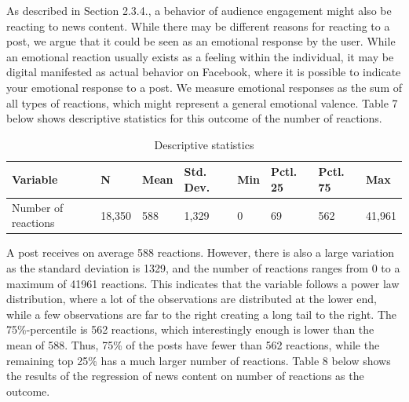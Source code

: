 \documentclass[
]{article}
\begin{document}
As described in Section 2.3.4., a behavior of audience engagement might
also be reacting to news content. While there may be different reasons
for reacting to a post, we argue that it could be seen as an emotional
response by the user. While an emotional reaction usually exists as a
feeling within the individual, it may be digital manifested as actual
behavior on Facebook, where it is possible to indicate your emotional
response to a post. We measure emotional responses as the sum of all
types of reactions, which might represent a general emotional valence.
Table 7 below shows descriptive statistics for this outcome of the
number of reactions.

\begin{table}[H]

\caption{\label{tab:react_describe}Descriptive statistics}
\centering
\begin{tabular}[t]{llllllll}
\toprule
Variable & N & Mean & Std. Dev. & Min & Pctl. 25 & Pctl. 75 & Max\\
\midrule
Number of reactions & 18,350 & 588 & 1,329 & 0 & 69 & 562 & 41,961\\
\bottomrule
\end{tabular}
\end{table}

\noindent A post receives on average 588 reactions. However, there is
also a large variation as the standard deviation is 1329, and the number
of reactions ranges from 0 to a maximum of 41961 reactions. This
indicates that the variable follows a power law distribution, where a
lot of the observations are distributed at the lower end, while a few
observations are far to the right creating a long tail to the right. The
75\%-percentile is 562 reactions, which interestingly enough is lower
than the mean of 588. Thus, 75\% of the posts have fewer than 562
reactions, while the remaining top 25\% has a much larger number of
reactions. Table 8 below shows the results of the regression of news
content on number of reactions as the outcome.
\end{document}
